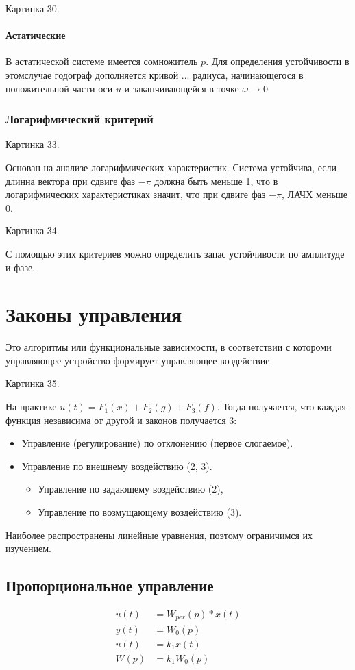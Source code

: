Картинка 30.

\paragraph{Астатические}
В астатической системе имеется сомножитель $p$. Для определения устойчивости в этомслучае годограф дополняется кривой ... радиуса, начинающегося в положительной части оси $u$ и заканчивающейся в точке $\omega\rightarrow0$

\subsubsection{Логарифмический критерий}
Картинка 33.

Основан на анализе логарифмических характеристик. Система устойчива, если длинна вектора при сдвиге фаз $-\pi$ должна быть меньше 1, что в логарифмических характеристиках значит, что при сдвиге фаз $-\pi$, ЛАЧХ меньше 0.

Картинка 34.

С помощью этих критериев можно определить запас устойчивости по амплитуде и фазе.

\section{Законы управления}
Это алгоритмы или функциональные зависимости, в соответствии с котороми управляющее устройство формирует управляющее воздействие.

Картинка 35.

На практике $u(t)=F_1(x)+F_2(g)+F_3(f)$. Тогда получается, что каждая функция независима от другой и законов получается 3:
\begin{itemize}
	\item Управление (регулирование) по отклонению (первое слогаемое).
	\item Управление по внешнему воздействию (2, 3).
		\begin{itemize}
			\item Управление по задающему воздействию (2),
			\item Управление по возмущающему воздействию (3).
		\end{itemize}
\end{itemize}

Наиболее распространены линейные уравнения, поэтому ограничимся их изучением.

\subsection{Пропорциональное управление}
\begin{align*}
	u(t)&=W_{per}(p)*x(t)\\
	y(t)&=W_0(p)\\
	u(t)&=k_1x(t)\\
	W(p)&=k_1W_0(p)
\end{align*}


